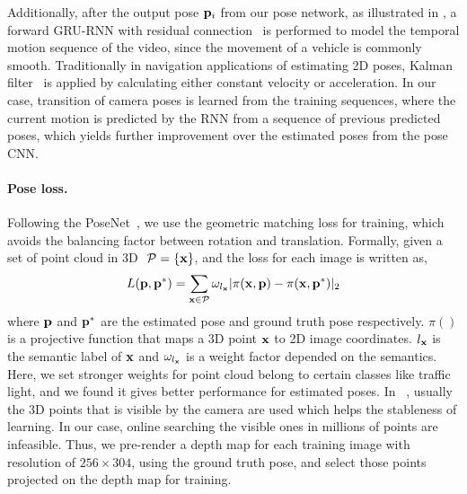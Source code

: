 Additionally, after the output pose ${\mathbf p}_i$ from our pose network, as illustrated in , a forward GRU-RNN with residual connection~\cite{wu2016google} is performed to model the temporal motion sequence of the video, since the movement of a vehicle is commonly smooth.
Traditionally in navigation applications of estimating 2D poses,  Kalman filter~\cite{kalman1960new} is applied by calculating either constant velocity or acceleration.
In our case, transition of camera poses is learned from the training sequences, where the current motion is predicted by the RNN from a sequence of previous predicted poses, which yields further improvement over the estimated poses from the pose CNN.


\paragraph{Pose loss.}
Following the PoseNet~\cite{}, we use the geometric matching loss for training, which avoids the balancing factor between rotation and translation.
Formally, given a set of point cloud in 3D $~{\mathcal P}=\{{\mathbf x}\}$, and the loss for each image is written as,
\begin{align}
L({\mathbf p}, {\mathbf p}^*) = \sum_{{\mathbf x} \in {\mathcal P}}\omega_{l_{\mathbf x}}|\pi({\mathbf x}, {\mathbf p}) - \pi({\mathbf x}, {\mathbf p}^*)|_2
\label{eq:proj_loss}
\end{align}
where ${\mathbf p}$ and ${\mathbf p}^*$ are the estimated pose and ground truth pose respectively. $\pi()$ is a projective function that maps a 3D point ${\mathbf x}$ to 2D image coordinates. $l_{\mathbf x}$ is the semantic label of ${\mathbf x}$ and $\omega_{l_{\mathbf x}}$ is a weight factor depended on the semantics. Here, we set stronger weights for point cloud belong to certain classes like traffic light, and we found it gives better performance for estimated poses.
In ~\cite{kendall2017geometric}, usually the 3D points that is visible by the camera are used which helps the stableness of learning. In our case, online searching the visible ones in millions of points are infeasible.
Thus, we pre-render a depth map for each training image with resolution of $256 \times 304$, using the ground truth pose, and select those points projected on the depth map for training.

